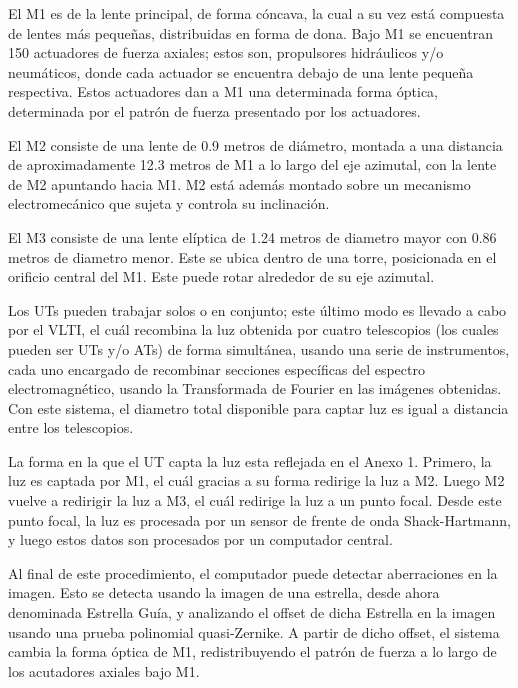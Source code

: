 El M1 es de la lente principal, de forma cóncava, la cual a su vez está compuesta de lentes más pequeñas, distribuidas en forma de dona.
Bajo M1 se encuentran 150 actuadores de fuerza axiales; estos son, propulsores hidráulicos y/o neumáticos, donde cada actuador se encuentra debajo de una lente pequeña respectiva.
Estos actuadores dan a M1 una determinada forma óptica, determinada por el patrón de fuerza presentado por los actuadores\cite{eso1998vlt}.

El M2 consiste de una lente de 0.9 metros de diámetro, montada a una distancia de aproximadamente 12.3 metros de M1 a lo largo del eje azimutal, con la lente de M2 apuntando hacia M1.
M2 está además montado sobre un mecanismo electromecánico que sujeta y controla su inclinación\cite{eso2011m2}. 

El M3 consiste de una lente elíptica de 1.24 metros de diametro mayor con 0.86 metros de diametro menor. Este se ubica dentro de una torre, posicionada en el orificio central del M1.
Este puede rotar alrededor de su eje azimutal\cite{eso2011m1}.

Los UTs pueden trabajar solos o en conjunto; este último modo es llevado a cabo por el VLTI, el cuál recombina la luz obtenida por cuatro telescopios (los cuales pueden ser UTs y/o ATs) de forma simultánea, usando una serie de instrumentos, cada uno encargado de recombinar secciones específicas del espectro electromagnético,
usando la Transformada de Fourier en las imágenes obtenidas. Con este sistema, el diametro total disponible para captar luz es igual a distancia entre los telescopios\cite{eso2023vlti}. 

La forma en la que el UT capta la luz esta reflejada en el Anexo 1. Primero, la luz es captada por M1, el cuál gracias a su forma redirige la luz a M2. Luego M2 vuelve a redirigir la luz a M3, el cuál 
redirige la luz a un punto focal. Desde este punto focal, la luz es procesada por un sensor de frente de onda Shack-Hartmann, y luego estos datos son procesados por un computador central\cite{eso1998vlt}.

Al final de este procedimiento, el computador puede detectar aberraciones en la imagen. Esto se detecta usando la imagen de una estrella, desde ahora denominada Estrella Guía, y analizando el offset de dicha Estrella en la imagen usando una prueba polinomial quasi-Zernike.
A partir de dicho offset, el sistema cambia la forma óptica de M1, redistribuyendo el patrón de fuerza a lo largo de los acutadores axiales bajo M1\cite{wilson1987active}.

